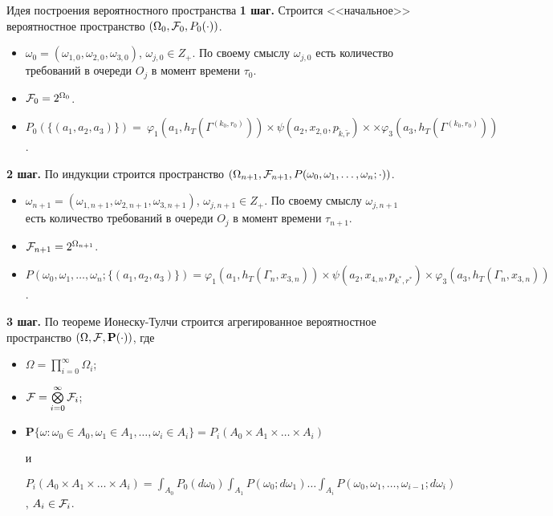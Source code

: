 \documentclass[10pt]{beamer}
\begin{document}
\begin{frame}[allowframebreaks]{Идея построения вероятностного пространства}
\textbf{1 шаг.} Строится <<начальное>> вероятностное пространство $(\Omega_0, {\cal F}_0, P_0(\cdot))$. 
\begin{itemize} 
\item $\omega_0 = (\omega_{1,0}, \omega_{2,0},\omega_{3,0})$, $\omega_{j,0} \in Z_+$. По своему смыслу $\omega_{j,0}$ есть количество требований в очереди $O_j$ в момент времени $\tau_0$.
\item ${\cal F}_0=2^{\Omega_0}$.
\item $P_0(\{(a_1,a_2,a_3)\})=~\varphi_1(a_1,h_T(\Gamma^{(k_0,r_0)})) \times \psi(a_2,x_{2,0}, p_{\tilde{k},\tilde{r}}) \times \times \varphi_3(a_3,h_T(\Gamma^{(k_0,r_0)}))$.
\end{itemize}

\framebreak
\textbf{2 шаг.} По индукции строится пространство $(\Omega_{n+1}, {\cal F}_{n+1}, P(\omega_0,\omega_1,\ldots, \omega_{n};\cdot))$.
\begin{itemize} 
\item $\omega_{n+1} = (\omega_{1,n+1}, \omega_{2,n+1},\omega_{3,n+1})$, $\omega_{j,n+1} \in Z_+$.  По своему смыслу $\omega_{j,n+1}$ есть количество требований в очереди $O_j$ в момент времени $\tau_{n+1}$.
\item ${\cal F}_{n+1}=2^{\Omega_{n+1}}$.
\item $P(\omega_0,\omega_1,\ldots,\omega_n;\{(a_1,a_2,a_3)\}) =  \varphi_1(a_1,h_T(\Gamma_n,x_{3,n})) \times \psi(a_2,x_{4,n}, p_{k^*,r^*}) \times \varphi_3(a_3,h_T(\Gamma_n,x_{3,n}))$.
\end{itemize}

\framebreak
\textbf{3 шаг.} По теореме Ионеску-Тулчи строится агрегированное вероятностное пространство $(\Omega, {\cal F}, {\mathbf P}(\cdot))$, где 
\begin{itemize}
\item $\Omega=\prod\limits_{i=0}^{\infty}\Omega_i$;
\item ${\cal F}=\bigotimes\limits_{i=0}^{\infty} {\cal F}_i$;
\item $ {\mathbf P}\{\omega \colon \omega_0 \in A_0, \omega_1 \in A_1, \ldots, \omega_i\in A_i\} = P_i(A_0 \times A_1 \times \ldots \times A_i)$

и

$ P_i(A_0 \times A_1 \times \ldots \times A_i) = \int_{A_0} P_0(d \omega_0) \int_{A_1} P(\omega_0;d \omega_1) \ldots \int_{A_i} P(\omega_0, \omega_1, \ldots, \omega_{i-1}; d \omega_i)$, $A_i \in {\cal F}_i$.
\end{itemize}



\end{frame}
\end{document}
